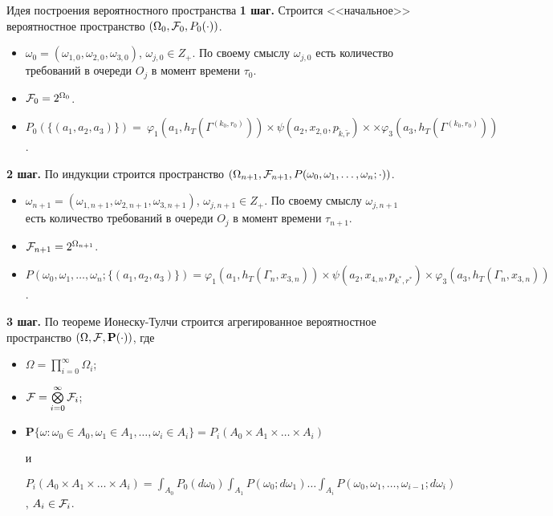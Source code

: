 \documentclass[10pt]{beamer}
\begin{document}
\begin{frame}[allowframebreaks]{Идея построения вероятностного пространства}
\textbf{1 шаг.} Строится <<начальное>> вероятностное пространство $(\Omega_0, {\cal F}_0, P_0(\cdot))$. 
\begin{itemize} 
\item $\omega_0 = (\omega_{1,0}, \omega_{2,0},\omega_{3,0})$, $\omega_{j,0} \in Z_+$. По своему смыслу $\omega_{j,0}$ есть количество требований в очереди $O_j$ в момент времени $\tau_0$.
\item ${\cal F}_0=2^{\Omega_0}$.
\item $P_0(\{(a_1,a_2,a_3)\})=~\varphi_1(a_1,h_T(\Gamma^{(k_0,r_0)})) \times \psi(a_2,x_{2,0}, p_{\tilde{k},\tilde{r}}) \times \times \varphi_3(a_3,h_T(\Gamma^{(k_0,r_0)}))$.
\end{itemize}

\framebreak
\textbf{2 шаг.} По индукции строится пространство $(\Omega_{n+1}, {\cal F}_{n+1}, P(\omega_0,\omega_1,\ldots, \omega_{n};\cdot))$.
\begin{itemize} 
\item $\omega_{n+1} = (\omega_{1,n+1}, \omega_{2,n+1},\omega_{3,n+1})$, $\omega_{j,n+1} \in Z_+$.  По своему смыслу $\omega_{j,n+1}$ есть количество требований в очереди $O_j$ в момент времени $\tau_{n+1}$.
\item ${\cal F}_{n+1}=2^{\Omega_{n+1}}$.
\item $P(\omega_0,\omega_1,\ldots,\omega_n;\{(a_1,a_2,a_3)\}) =  \varphi_1(a_1,h_T(\Gamma_n,x_{3,n})) \times \psi(a_2,x_{4,n}, p_{k^*,r^*}) \times \varphi_3(a_3,h_T(\Gamma_n,x_{3,n}))$.
\end{itemize}

\framebreak
\textbf{3 шаг.} По теореме Ионеску-Тулчи строится агрегированное вероятностное пространство $(\Omega, {\cal F}, {\mathbf P}(\cdot))$, где 
\begin{itemize}
\item $\Omega=\prod\limits_{i=0}^{\infty}\Omega_i$;
\item ${\cal F}=\bigotimes\limits_{i=0}^{\infty} {\cal F}_i$;
\item $ {\mathbf P}\{\omega \colon \omega_0 \in A_0, \omega_1 \in A_1, \ldots, \omega_i\in A_i\} = P_i(A_0 \times A_1 \times \ldots \times A_i)$

и

$ P_i(A_0 \times A_1 \times \ldots \times A_i) = \int_{A_0} P_0(d \omega_0) \int_{A_1} P(\omega_0;d \omega_1) \ldots \int_{A_i} P(\omega_0, \omega_1, \ldots, \omega_{i-1}; d \omega_i)$, $A_i \in {\cal F}_i$.
\end{itemize}



\end{frame}
\end{document}
